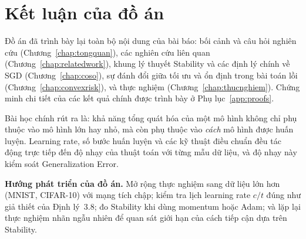 \section{Kết luận của đồ án}
\label{sec:ketluan-doan}

Đồ án đã trình bày lại toàn bộ nội dung của bài báo: bối cảnh và câu hỏi nghiên cứu (Chương~\ref{chap:tongquan}), các nghiên cứu liên quan (Chương~\ref{chap:relatedwork}), khung lý thuyết Stability và các định lý chính về SGD (Chương~\ref{chap:coso}), sự đánh đổi giữa tối ưu và ổn định trong bài toán lồi (Chương~\ref{chap:convexrisk}), và thực nghiệm (Chương~\ref{chap:thucnghiem}). Chứng minh chi tiết của các kết quả chính được trình bày ở Phụ lục~\ref{app:proofs}.

Bài học chính rút ra là: khả năng tổng quát hóa của một mô hình không chỉ phụ thuộc vào mô hình lớn hay nhỏ, mà còn phụ thuộc vào \emph{cách} mô hình được huấn luyện. Learning rate, số bước huấn luyện và các kỹ thuật điều chuẩn đều tác động trực tiếp đến độ nhạy của thuật toán với từng mẫu dữ liệu, và độ nhạy này kiểm soát Generalization Error.

\textbf{Hướng phát triển của đồ án.} Mở rộng thực nghiệm sang dữ liệu lớn hơn (MNIST, CIFAR-10) với mạng tích chập; kiểm tra lịch learning rate $c/t$ đúng như giả thiết của Định lý~3.8; đo Stability khi dùng momentum hoặc Adam; và lặp lại thực nghiệm nhãn ngẫu nhiên để quan sát giới hạn của cách tiếp cận dựa trên Stability.
